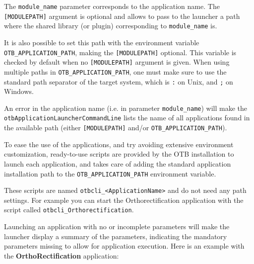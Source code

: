 The \verb?module_name? parameter corresponds to the application
name. The \verb?[MODULEPATH]? argument is optional and allows 
to pass to the launcher a path where the shared library (or plugin) 
corresponding to \verb?module_name? is.

It is also possible to set this path with the environment variable 
\verb?OTB_APPLICATION_PATH?, making the \verb?[MODULEPATH]? optional.
This variable is checked by default when 
no \verb?[MODULEPATH]? argument is given.
When using multiple paths in \verb?OTB_APPLICATION_PATH?, one must make sure to use
the standard path separator of the target system, which is \verb?:? on Unix, and \verb?;? on Windows.


An error in the application name (i.e. in parameter
\verb?module_name?) will make the
\verb?otbApplicationLauncherCommandLine? lists the name of all
applications found in the available path (either \verb?[MODULEPATH]? 
and/or \verb?OTB_APPLICATION_PATH?).

To ease the use of the applications, and try avoiding extensive environment
customization, ready-to-use scripts are provided by the OTB installation
to launch each application, and takes care of adding the standard application
installation path to the \verb?OTB_APPLICATION_PATH? environment variable.

These scripts are named \verb?otbcli_<ApplicationName>? and do not need any path
settings. For example you can start the Orthorectification application
with the script called \verb?otbcli_Orthorectification?.


Launching an application with no or incomplete parameters will make the
launcher display a summary of the parameters, indicating the mandatory parameters
missing to allow for application execution. Here is an example
with the \textbf{OrthoRectification} application:

